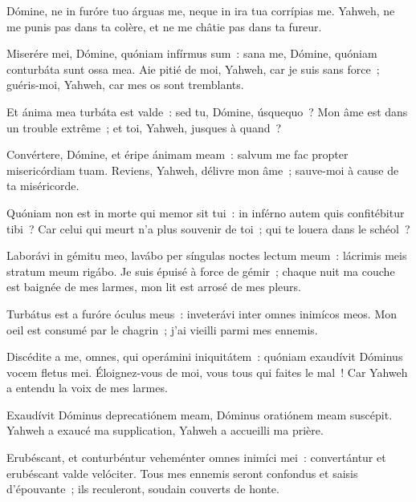 \Gloria
{}
\begin{paracol}{2}

\LigneParacol{0cm}
{Dómine, ne in furóre tuo árguas me, \GreStar{} neque in ira tua corrípias me.}
{Yahweh, ne me punis pas dans ta colère, et ne me châtie pas dans ta fureur. }

\LigneParacol{0.2cm}
{Miserére mei, Dómine, quóniam infírmus sum~: \GreStar{} sana me, Dómine, quóniam conturbáta sunt ossa mea.}
{Aie pitié de moi, Yahweh, car je suis sans force~; guéris-moi, Yahweh, car mes os sont tremblants. }

\LigneParacol{0.2cm}
{Et ánima mea turbáta est valde~: \GreStar{} sed tu, Dómine, úsquequo~?}
{Mon âme est dans un trouble extrême~; et toi, Yahweh, jusques à quand~? }

\LigneParacol{0.2cm}
{Convértere, Dómine, et éripe ánimam meam~: \GreStar{} salvum me fac propter misericórdiam tuam.}
{Reviens, Yahweh, délivre mon âme~; sauve-moi à cause de ta miséricorde. }

\LigneParacol{0.2cm}
{Quóniam non est in morte qui memor sit tui~: \GreStar{} in inférno autem quis confitébitur tibi~?}
{Car celui qui meurt n'a plus souvenir de toi~; qui te louera dans le schéol~? }

\LigneParacol{0.2cm}
{Laborávi in gémitu meo, lavábo per síngulas noctes lectum meum~: \GreStar{} lácrimis meis stratum meum rigábo.}
{Je suis épuisé à force de gémir~; chaque nuit ma couche est baignée de mes larmes, mon lit est arrosé de mes pleurs. }

\LigneParacol{0.2cm}
{Turbátus est a furóre óculus meus~: \GreStar{} inveterávi inter omnes inimícos meos.}
{Mon oeil est consumé par le chagrin~; j'ai vieilli parmi mes ennemis. }

\LigneParacol{0.2cm}
{Discédite a me, omnes, qui operámini iniquitátem~: \GreStar{} quóniam exaudívit Dóminus vocem fletus mei.}
{Éloignez-vous de moi, vous tous qui faites le mal~! Car Yahweh a entendu la voix de mes larmes. }

\LigneParacol{0.2cm}
{Exaudívit Dóminus deprecatiónem meam, \GreStar{} Dóminus oratiónem meam suscépit.}
{Yahweh a exaucé ma supplication, Yahweh a accueilli ma prière. }

\LigneParacol{0.2cm}
{Erubéscant, et conturbéntur veheménter omnes inimíci mei~: \GreStar{} convertántur et erubéscant valde velóciter.}
{Tous mes ennemis seront confondus et saisis d'épouvante~; ils reculeront, soudain couverts de honte.  }

\end{paracol}
